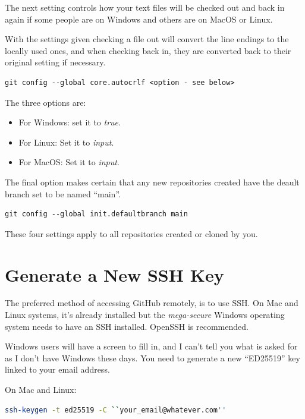 The next setting controls how your text files will be checked out and back in again if some people are on Windows and others are on MacOS or Linux.

With the settings given checking a file out will convert the line endings to the locally used ones, and when checking back in, they are converted back to their original setting if necessary.

\begin{lstlisting}[style=myText]
git config --global core.autocrlf <option - see below>
\end{lstlisting}

The three options are:

\begin{itemize}
    \item For Windows: set it to \emph{true}.
    \item For Linux: Set it to \emph{input}.
    \item For MacOS: Set it to \emph{input}.
\end{itemize}

The final option makes certain that any new repositories created have the deault branch set to be named ``main''.

\begin{lstlisting}[style=myText]
git config --global init.defaultbranch main
\end{lstlisting}

These four settings apply to all repositories created or cloned by you.

\section{Generate a New SSH Key}

The preferred method of accessing GitHub remotely, is to use SSH. On Mac and Linux systems, it's already installed but the \emph{mega-secure} Windows operating system needs to have an SSH installed. OpenSSH is recommended.

Windows users will have a screen to fill in, and I can't tell you what is asked for as I don't have Windows these days. You need to generate a new ``ED25519'' key linked to your email address.

On Mac and Linux:

\begin{lstlisting}[style=myText,language=bash]
ssh-keygen -t ed25519 -C ``your_email@whatever.com''
\end{lstlisting}

